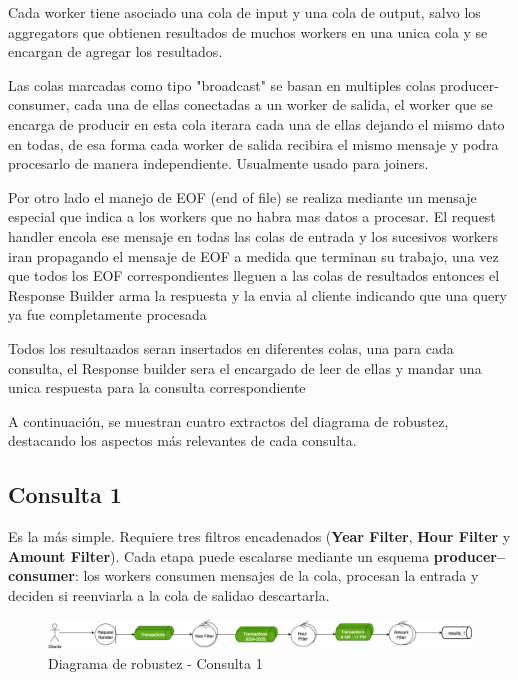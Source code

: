 \documentclass[titlepage,a4paper]{article}
\begin{document}
Cada worker tiene asociado una cola de input y una cola de output, salvo los aggregators que obtienen resultados de muchos workers en una unica cola y se encargan de agregar los resultados.

Las colas marcadas como tipo "broadcast" se basan en multiples colas producer-consumer, cada una de ellas conectadas a un worker de salida, el worker que se encarga de producir en esta cola iterara cada una de ellas dejando el mismo dato en todas, de esa forma cada worker de salida recibira el mismo mensaje y podra procesarlo de manera independiente. Usualmente usado para joiners.

Por otro lado el manejo de EOF (end of file) se realiza mediante un mensaje especial que indica a los workers que no habra mas datos a procesar. El request handler encola ese mensaje en todas las colas de entrada y los sucesivos workers iran propagando el mensaje de EOF a medida que terminan su trabajo, una vez que todos los EOF correspondientes lleguen a las colas de resultados entonces el Response Builder arma la respuesta y la envia al cliente indicando que una query ya fue completamente procesada

Todos los resultaados seran insertados en diferentes colas, una para cada consulta, el Response builder sera el encargado de leer de ellas y mandar una unica respuesta para la consulta correspondiente

A continuación, se muestran cuatro extractos del diagrama de robustez, destacando los aspectos más relevantes de cada consulta.

\subsection*{Consulta 1}
Es la más simple. Requiere tres filtros encadenados (\textbf{Year Filter}, \textbf{Hour Filter} y \textbf{Amount Filter}).  
Cada etapa puede escalarse mediante un esquema \textbf{producer--consumer}: los workers consumen mensajes de la cola, procesan la entrada y deciden si reenviarla a la cola de salidao descartarla.

\begin{figure}[H]
    \centering
    \includegraphics[width=1.0\textwidth]{consulta1.png}
    \caption{Diagrama de robustez - Consulta 1}
\end{figure}
\end{document}
